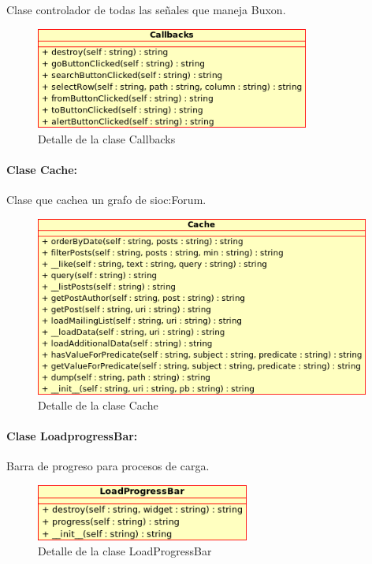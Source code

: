 Clase controlador de todas las señales que maneja Buxon.

\begin{figure}[H]
	\centering
 	\includegraphics[width=9cm]{images/uml/clases/callbacks-class.png}
	\caption{Detalle de la clase Callbacks}
	\label{fig:uml:callbacks-class}
\end{figure}

\paragraph{Clase Cache:}

Clase que cachea un grafo de sioc:Forum.

\begin{figure}[H]
	\centering
 	\includegraphics[width=11cm]{images/uml/clases/cache-class.png}
	\caption{Detalle de la clase Cache}
	\label{fig:uml:cache-class}
\end{figure}

\paragraph{Clase LoadprogressBar:}

Barra de progreso para procesos de carga.

\begin{figure}[H]
	\centering
 	\includegraphics[width=7cm]{images/uml/clases/loadprogressbar-class.png}
	\caption{Detalle de la clase LoadProgressBar}
	\label{fig:uml:loadprogressbar-class}
\end{figure}

